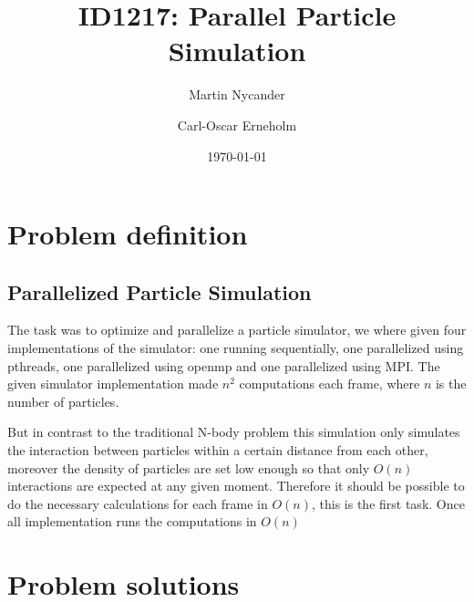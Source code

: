 \documentclass[titlepage,a4paper,10pt]{article}
\title{ID1217: Parallel Particle Simulation}
\author{Martin Nycander \and Carl-Oscar Erneholm}
\date{\today}
\begin{document}
\maketitle

\tableofcontents
\newpage

\setcounter{page}{1}

\section{Problem definition}

    \subsection{Parallelized Particle Simulation}

    The task was to optimize and parallelize a particle simulator, we
    where given four implementations of the simulator: one running sequentially,
    one parallelized using pthreads, one parallelized using openmp and one
    parallelized using MPI. The given simulator implementation made $n^2$
    computations each frame, where $n$ is the number of particles.

    But in contrast to the traditional N-body problem this simulation only
    simulates the interaction between particles within a certain distance from
    each other, moreover the density of particles are set low enough so that
    only $O(n)$ interactions are expected at any given moment. Therefore it
    should be possible to do the necessary calculations for each frame in
    $O(n)$, this is the first task. Once all implementation runs the
    computations in $O(n)$ %



\section{Problem solutions}
\end{document}
